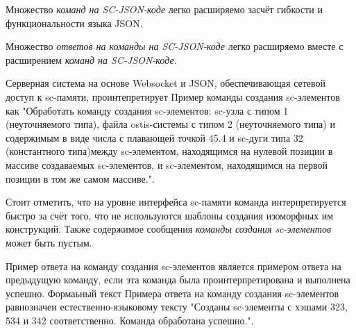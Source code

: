 
Множество \textit{команд на SC-JSON-коде} легко расширяемо засчёт гибкости и функциональности языка JSON.


Множество \textit{ответов на команды на SC-JSON-коде} легко расширяемо вместе с расширением \textit{команд на SC-JSON-коде}.

\begin{scnindent}
\end{scnindent}

Серверная система на основе Websocket и JSON, обеспечивающая сетевой доступ к sc-памяти, проинтепретирует Пример
команды создания sc-элементов как "Обработать команду создания sc-элементов: sc-узла с типом 1
(неуточняемого типа), файла ostis-системы с типом 2 (неуточняемого типа) и содержимым в виде числа с плавающей точкой
45.4 и sc-дуги типа 32 (константного типа)между sc-элементом, находящимся на нулевой позиции в массиве создаваемых
sc-элементов, и sc-элементом, находящимся на первой позиции в том же самом массиве.".

Стоит отметить, что на уровне интерфейса sc-памяти команда интерпретируется быстро за счёт того, что не используются
шаблоны создания изоморфных им конструкций. Также содержимое сообщения \textit{команды создания sc-элементов} может
быть пустым.

\begin{scnindent}
\end{scnindent}

Пример ответа на команду создания sc-элементов является примером ответа на предыдущую команду, если эта команда была
проинтерпретирована и выполнена успешно. Формаьный текст Примера ответа на команду создания sc-элементов равнозначен
естественно-языковому тексту "Созданы sc-элементы с хэшами 323, 534 и 342 соответственно. Команда обработана успешно.".

